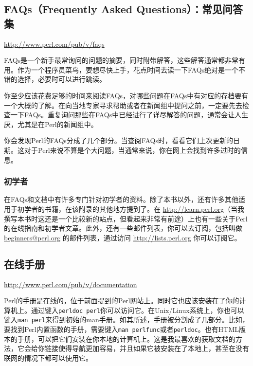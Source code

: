 \subsection{FAQs（Frequently Asked Questions）：常见问答集}
\href{http://www.perl.com/pub/v/faqs}{http://www.perl.com/pub/v/faqs}

\begin{adjustwidth}{1cm}{}
FAQs是一个新手最常询问的问题的摘要，同时附带解答，这些解答通常都非常有用。作为一个程序员菜鸟，要想尽快上手，花点时间去读一下FAQs绝对是一个不错的选择，必要时可以进行跳读。
\end{adjustwidth}

你至少应该花费足够的时间来阅读FAQs，对哪些问题在FAQs中有对应的存档要有一个大概的了解。在向当地专家寻求帮助或者在新闻组中提问之前，一定要先去检查一下FAQs。重复询问那些在FAQs中已经进行了详尽解答的问题，通常会让人生厌，尤其是在Perl的新闻组中。

你会发现Perl的FAQs分成了几个部分。当查阅FAQs时，看看它们上次更新的日期。这对于Perl来说不算是个大问题，当通常来说，你在网上会找到许多过时的信息。

\subsubsection{初学者}
在FAQs和文档中有许多专门针对初学者的资料。除了本书以外，还有许多其他适用于初学者的书籍，在该附录的其他地方提到了。在 \href{http://learn.perl.org}{http://learn.perl.org}（当我撰写本书时这还是一个比较新的站点，但看起来非常有前途）上也有一些关于Perl的在线指南和初学者文章。此外，还有一些邮件列表，你可以去订阅，包括叫做 \href{mailto:beginners@perl.org}{beginners@perl.org} 的邮件列表，通过访问 \href{http://lists.perl.org}{http://lists.perl.org} 你可以订阅它。

\subsection{在线手册}
\href{http://www.perl.com/pub/v/documentation}{http://www.perl.com/pub/v/documentation}

\begin{adjustwidth}{1cm}{}
Perl的手册是在线的，位于前面提到的Perl网站上。同时它也应该安装在了你的计算机上。通过键入\verb|perldoc perl|你可以访问它。在Unix/Linux系统上，你也可以键入\verb|man perl|来得到初始的man手册。如其所述，手册被分割成了几部分。比如，要找到Perl内置函数的手册，需要键入\verb|man perlfunc|或者\verb|perldoc|。也有HTML版本的手册，可以把它们安装在你本地的计算机上。这是我最喜欢的获取文档的方法，它会给你链接使得导航更加容易，并且如果它被安装在了本地上，甚至在没有联网的情况下都可以使用它。
\end{adjustwidth}

